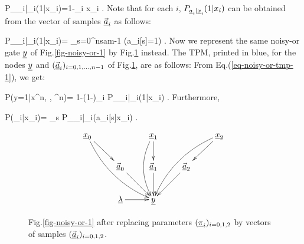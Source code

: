 \beq
P_{\rva_i|\rvx_i}(1|x_i)=1-\pi_i x_i
\;.
\eeq
Note that for each $i$,
$P_{{\underline{a}}_i|{\underline{x}}_i}(1|x_i)$
can be 
obtained
from the vector of samples
$\vec{{\underline{a}}}_i$ 
as follows:


\beq
P_{\rva_i|\rvx_i}(1|x_i)=
\sum_{s=0}^{nsam-1} \indi(a_i[s]=1)
\;.
\eeq
Now we represent 
the same noisy-or gate ${\underline{y}}$
of 
Fig.\ref{fig-noisy-or-1}
by 
Fig.\ref{fig-noisy-or-2}
instead.
The TPM, printed in blue,
for  
the nodes ${\underline{y}}$
and $(\vec{{\underline{a}}}_i)_{i=0,1,\ldots, n-1}$
of Fig.\ref{fig-noisy-or-2}, are  as follows:
From Eq.(\ref{eq-noisy-or-tmp-1}),
we get:

\beq\color{blue}
P(y=1|x^n, \lam, \veca^n)=
1-(1-\lam)\prod_i P_{\rva_i|\rvx_i}(1|x_i)
\;.
\eeq
Furthermore, 

\beq\color{blue}
P(\veca_i|x_i)=
\prod_s P_{\rva_i|\rvx_i}(a_i[s]\cond x_i)
\;.
\eeq

\begin{figure}[h!]
$$\xymatrix{
\rvx_0\ar[dr]\ar@/_1pc/[ddrr]
&&\rvx_1\ar[d]\ar@/_1pc/[dd]
&&\rvx_2\ar@/_1pc/[ddll]\ar[dl]
\\
&\vec{\rva}_0\ar[dr]
&\vec{\rva}_1\ar[d]
&\vec{\rva}_2\ar[dl]
\\
&\ul{\lam}\ar[r]
&\rvy
}$$
\caption{ Fig.\ref{fig-noisy-or-1}
after replacing parameters 
$(\underline{\pi}_i)_{i=0,1,2}$
by 
vectors 
of samples $(\vec{{\underline{a}}}_i)_{i=0,1,2}$.}
\label{fig-noisy-or-2}
\end{figure}